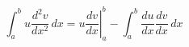 \begin{equation}
\int_{a}^{b}u\frac{d^{2}v}{dx^{2}}\,dx=\left.u\frac{dv}{dx}\right|_{a}^{b}-\int_{a}^{b}\frac{du}{dx}\frac{dv}{dx}\,dx
 \end{equation}